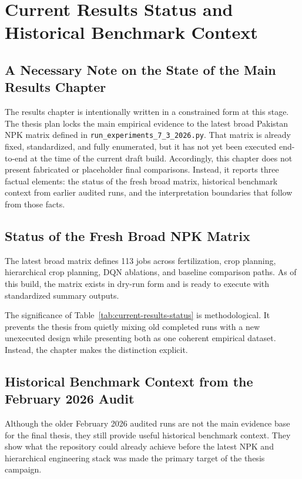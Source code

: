 \chapter{Current Results Status and Historical Benchmark Context}

\section{A Necessary Note on the State of the Main Results Chapter}

The results chapter is intentionally written in a constrained form at this stage. The thesis plan locks the main empirical evidence to the latest broad Pakistan NPK matrix defined in \texttt{run\_experiments\_7\_3\_2026.py}. That matrix is already fixed, standardized, and fully enumerated, but it has not yet been executed end-to-end at the time of the current draft build. Accordingly, this chapter does not present fabricated or placeholder final comparisons. Instead, it reports three factual elements: the status of the fresh broad matrix, historical benchmark context from earlier audited runs, and the interpretation boundaries that follow from those facts.

\section{Status of the Fresh Broad NPK Matrix}

The latest broad matrix defines 113 jobs across fertilization, crop planning, hierarchical crop planning, DQN ablations, and baseline comparison paths. As of this build, the matrix exists in dry-run form and is ready to execute with standardized summary outputs.



The significance of Table~\ref{tab:current-results-status} is methodological. It prevents the thesis from quietly mixing old completed runs with a new unexecuted design while presenting both as one coherent empirical dataset. Instead, the chapter makes the distinction explicit.

\section{Historical Benchmark Context from the February 2026 Audit}

Although the older February 2026 audited runs are not the main evidence base for the final thesis, they still provide useful historical benchmark context. They show what the repository could already achieve before the latest NPK and hierarchical engineering stack was made the primary target of the thesis campaign.

